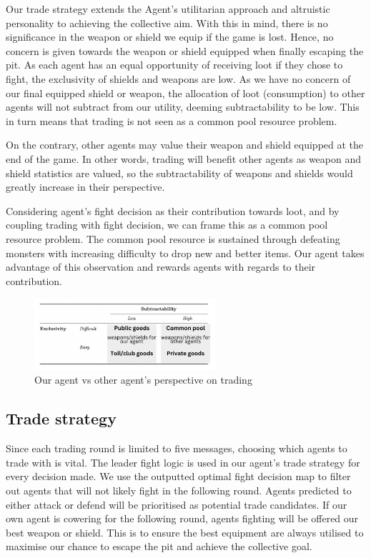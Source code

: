 Our trade strategy extends the Agent's utilitarian approach and altruistic personality to achieving the collective aim. With this in mind, there is no significance in the weapon or shield we equip if the game is lost. Hence, no concern is given towards the weapon or shield equipped when finally escaping the pit. As each agent has an equal opportunity of receiving loot if they chose to fight, the exclusivity of shields and weapons are low. As we have no concern of our final equipped shield or weapon, the allocation of loot (consumption) to other agents will not subtract from our utility, deeming subtractability to be low. This in turn means that trading is not seen as a common pool resource problem.

On the contrary, other agents may value their weapon and shield equipped at the end of the game. In other words, trading will benefit other agents as weapon and shield statistics are valued, so the subtractability of weapons and shields would greatly increase in their perspective.

Considering agent's fight decision as their contribution towards loot, and by coupling trading with fight decision, we can frame this as a common pool resource problem. The common pool resource is sustained through defeating monsters with increasing difficulty to drop new and better items. Our agent takes advantage of this observation and rewards agents with regards to their contribution.

\begin{figure}[!ht]
    \centering
    \includegraphics[width=0.60\textwidth]{008_team_5_agent_design/images/13.png}
    \caption{Our agent vs other agent's perspective on trading \cite{pitt}}
    \label{13}
\end{figure}

\subsection{Trade strategy}
Since each trading round is limited to five messages, choosing which agents to trade with is vital. The leader fight logic is used in our agent's trade strategy for every decision made. We use the outputted optimal fight decision map to filter out agents that will not likely fight in the following round. Agents predicted to either attack or defend will be prioritised as potential trade candidates. If our own agent is cowering for the following round, agents fighting will be offered our best weapon or shield. This is to ensure the best equipment are always utilised to maximise our chance to escape the pit and achieve the collective goal.

